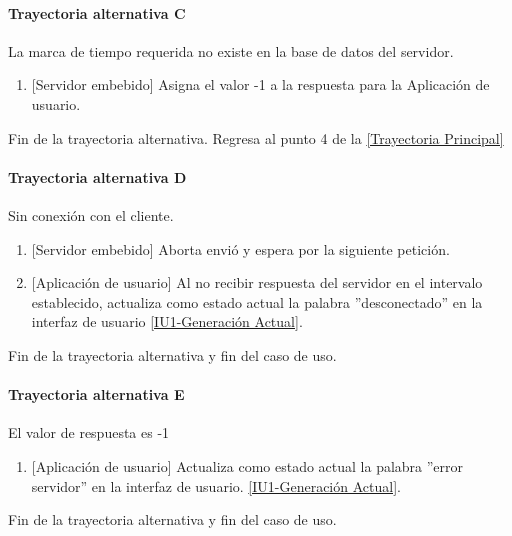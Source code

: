 \paragraph{Trayectoria alternativa C} \label{SUB-U-CU1.1:TC}
	La marca de tiempo requerida no existe en la base de datos del servidor.
	\begin{enumerate}[label=C\arabic*.]
		\item {[Servidor embebido]} Asigna el valor -1 a la respuesta para la Aplicación de usuario.
	\end{enumerate}
	Fin de la trayectoria alternativa. Regresa al punto 4 de la  \hyperref[SUB-U-CU1.1:TP]{[Trayectoria Principal]}

\paragraph{Trayectoria alternativa D} \label{SUB-U-CU1.1:TD}
	Sin conexión con el cliente.
	\begin{enumerate}[label=D\arabic*.]
		\item {[Servidor embebido]} Aborta envió y espera por la siguiente petición.
		\item {[Aplicación de usuario]} Al no recibir respuesta del servidor en el intervalo establecido, actualiza como estado actual la palabra ''desconectado'' en la interfaz de usuario \hyperref[fig:monitoreo]{[IU1-Generación Actual]}.
	\end{enumerate}
	Fin de la trayectoria alternativa y fin del caso de uso.
	
\paragraph{Trayectoria alternativa E} \label{SUB-U-CU1.1:TE}
	El valor de respuesta es -1
	\begin{enumerate}[label=E\arabic*.]
		\item {[Aplicación de usuario]} Actualiza como estado actual la palabra ''error servidor'' en la interfaz de usuario. \hyperref[fig:monitoreo]{[IU1-Generación Actual]}.
	\end{enumerate}
	Fin de la trayectoria alternativa y fin del caso de uso.